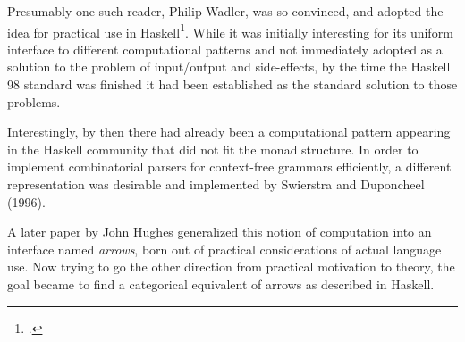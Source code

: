 Presumably one such reader, Philip Wadler, was so convinced, and adopted
the idea for practical use in Haskell\footcite[7.2]{hask-history}. While
it was initially interesting for its uniform interface to different
computational patterns and not immediately adopted as a solution to the
problem of input/output and side-effects, by the time the Haskell 98
standard was finished it had been established as the standard solution
to those problems.

Interestingly, by then there had already been a computational pattern
appearing in the Haskell community that did not fit the monad structure.
In order to implement combinatorial parsers for context-free grammars
efficiently, a different representation was desirable and implemented by
Swierstra and Duponcheel (1996).

A later paper by John Hughes generalized this notion of computation into
an interface named \emph{arrows}, born out of practical considerations
of actual language use. Now trying to go the other direction from
practical motivation to theory, the goal became to find a categorical
equivalent of arrows as described in Haskell.

%
%
